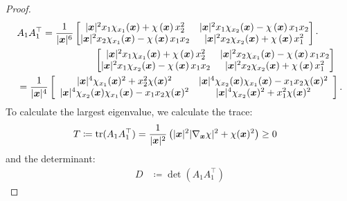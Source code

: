 \begin{proof}
    \small\begin{align*}
              &A_1 A_1^\top= \frac{1}{|{{\bm{x}}}|^6}\begin{bmatrix} |{{\bm{x}}}|^2{x}_1\chi_{x_1}({{\bm{x}}})+\chi\left({{\bm{x}}}\right)  {x}_2^2  & |{{\bm{x}}}|^2{x}_1\chi_{x_2}({{\bm{x}}})-\chi\left({{\bm{x}}}\right) {x}_1{x}_2 \\ |{{\bm{x}}}|^2{x}_2\chi_{x_1}({{\bm{x}}}) -\chi\left({{\bm{x}}}\right) {x}_1{x}_2& |{{\bm{x}}}|^2{x}_2\chi_{{x}_2}({{\bm{x}}})+\chi\left({{\bm{x}}}\right) {x}_1^2 \end{bmatrix} \cdot \\ &\qquad \qquad\qquad \qquad \begin{bmatrix} |{{\bm{x}}}|^2{x}_1\chi_{{x}_1}({{\bm{x}}})+\chi\left({{\bm{x}}}\right)  {x}_2^2  &  |{{\bm{x}}}|^2{x}_2\chi_{{x}_1}({{\bm{x}}}) -\chi\left({{\bm{x}}}\right) {x}_1{x}_2\\|{{\bm{x}}}|^2{x}_1\chi_{{x}_2}({{\bm{x}}})-\chi\left({{\bm{x}}}\right) {x}_1{x}_2  & |{{\bm{x}}}|^2{x}_2\chi_{{x}_2}({{\bm{x}}})+\chi\left({{\bm{x}}}\right) {x}_1^2 \end{bmatrix}\\
              &=\frac{1}{|{{\bm{x}}}|^4}\left[
                                    \begin{array}{cc}
                                        |{{\bm{x}}}|^4 \chi_{{x}_1}({{\bm{x}}})^2+{x}_2^2 \chi({{\bm{x}}})^2 & |{{\bm{x}}}|^4 \chi_{{x}_2}({{\bm{x}}}) \chi_{{x}_1}({{\bm{x}}})-{x}_1 {x}_2 \chi({{\bm{x}}})^2 \\
                                        |{{\bm{x}}}|^4 \chi_{{x}_2 }({{\bm{x}}}) \chi_{{x}_1}({{\bm{x}}})-{x}_1 {x}_2 \chi({{\bm{x}}})^2 & |{{\bm{x}}}|^4 \chi_{{x}_2}({{\bm{x}}})^2+{x}_1^2 \chi({{\bm{x}}})^2\\
                                    \end{array}
              \right].
    \end{align*}
    To calculate the largest eigenvalue, we calculate the trace:
    \begin{align*}
        T&\coloneqq \operatorname{tr}(A_1 A_1^\top)
        = \frac{1}{|{{\bm{x}}}|^2}\left( |{{\bm{x}}}|^2  |\nabla_{{{\bm{x}}}} \chi|^2  +\chi({{\bm{x}}})^2   \right)
        \geq0
    \end{align*}
    and the determinant:
    \begin{align*}
        D&\coloneqq\det(A_1 A_1^\top)

\end{align*}
\end{proof}
